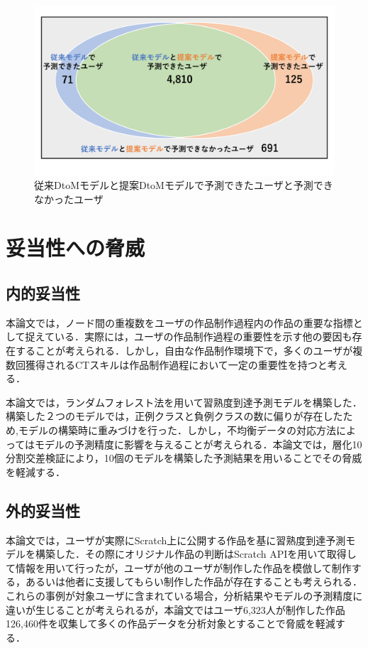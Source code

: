 \documentclass[submit,ses,noauthor]{ipsj}
\begin{document}
\begin{figure}[t]
	\centering
	\includegraphics[width=1.0\linewidth]{Okamoto_fig/dtom-venn.pdf}
        \vspace{-15mm}
	\caption{従来DtoMモデルと提案DtoMモデルで予測できたユーザと予測できなかったユーザ}
	\label{fig:dtom-venn}
\end{figure}



\chapter{妥当性への脅威}
\section{内的妥当性}

本論文では，ノード間の重複数をユーザの作品制作過程内の作品の重要な指標として捉えている．実際には，ユーザの作品制作過程の重要性を示す他の要因も存在することが考えられる．しかし，自由な作品制作環境下で，多くのユーザが複数回獲得されるCTスキルは作品制作過程において一定の重要性を持つと考える．

本論文では，ランダムフォレスト法を用いて習熟度到達予測モデルを構築した．構築した２つのモデルでは，正例クラスと負例クラスの数に偏りが存在したため,モデルの構築時に重みづけを行った．しかし，不均衡データの対応方法によってはモデルの予測精度に影響を与えることが考えられる．本論文では，層化10分割交差検証により，10個のモデルを構築した予測結果を用いることでその脅威を軽減する．

\section{外的妥当性}

本論文では，ユーザが実際にScratch上に公開する作品を基に習熟度到達予測モデルを構築した．その際にオリジナル作品の判断はScratch APIを用いて取得して情報を用いて行ったが，ユーザが他のユーザが制作した作品を模倣して制作する，あるいは他者に支援してもらい制作した作品が存在することも考えられる．これらの事例が対象ユーザに含まれている場合，分析結果やモデルの予測精度に違いが生じることが考えられるが，本論文ではユーザ6,323人が制作した作品126,460件を収集して多くの作品データを分析対象とすることで脅威を軽減する．
\end{document}
